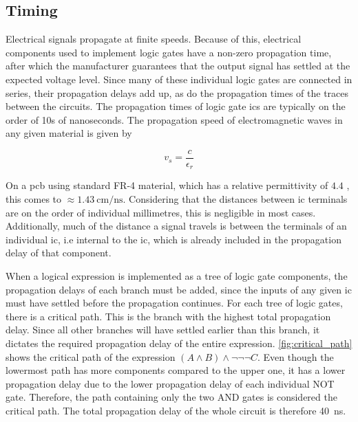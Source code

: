 \subsection{Timing}

Electrical signals propagate at finite speeds. Because of this, electrical components used to implement logic gates have a non-zero propagation time, after which the manufacturer guarantees that the output signal has settled at the expected voltage level. Since many of these individual logic gates are connected in series, their propagation delays add up, as do the propagation times of the traces between the circuits. The propagation times of logic gate \acp{ic} are typically on the order of 10s of nanoseconds. The propagation speed of electromagnetic waves in any given material is given by \cite{heule2016stratified}

\begin{displaymath}
    v_s = \frac{c}{\epsilon_r}
\end{displaymath}

On a \ac{pcb} using standard FR-4 material, which has a relative permittivity of $4.4$ \cite{azar1996experimental}, this comes to $\approx \SI[per-mode=symbol]{1.43}{\centi\metre\per\nano\second}$. Considering that the distances between \ac{ic} terminals are on the order of individual millimetres, this is negligible in most cases. Additionally, much of the distance a signal travels is between the terminals of an individual \ac{ic}, i.e internal to the \ac{ic}, which is already included in the propagation delay of that component.

When a logical expression is implemented as a tree of logic gate components, the propagation delays of each branch must be added, since the inputs of any given \ac{ic} must have settled before the propagation continues. For each tree of logic gates, there is a critical path. This is the branch with the highest total propagation delay. Since all other branches will have settled earlier than this branch, it dictates the required propagation delay of the entire expression. \autoref{fig:critical_path} shows the critical path of the expression $(A \land B) \land \lnot \lnot \lnot C$. Even though the lowermost path has more components compared to the upper one, it has a lower propagation delay due to the lower propagation delay of each individual NOT gate. Therefore, the path containing only the two AND gates is considered the critical path. The total propagation delay of the whole circuit is therefore \SI{40}{\nano\second}.

